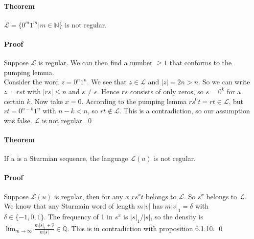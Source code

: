 \documentclass{article}
\begin{document}
\paragraph{Theorem}
$\mathcal{L} = \{0^m1^m | m \in \mathbb{N}\}$ is not regular.

\paragraph{Proof}
Suppose $\mathcal{L}$ is regular. We can then find a number $\ge 1$ that
conforms to the pumping lemma.\\
Consider the word $z = 0^n 1^n$. We see that $z \in \mathcal{L}$ and
$|z| = 2n > n$. So we can write $z = r s t$ with $|r s| \le n$ and
$s \ne \epsilon$. Hence $rs$ consists of only zeros, so $s = 0^k$ for a certain
$k$. Now take $x = 0$. According to the pumping lemma
$r s^0 t = r t \in \mathcal{L}$, but $r t = 0^{n - k} 1^n$ with $n - k < n$, so
$rt \notin \mathcal{L}$. This is a contradiction, so our assumption was false.
$\mathcal{L}$ is not regular. \qed

\paragraph{Theorem}
If $u$ is a Sturmian sequence, the language $\mathcal{L}(u)$ is not regular.

\paragraph{Proof}
Suppose $\mathcal{L}(u)$ is regular, then for any $x$ $r s^x t$ belongs to
$\mathcal{L}$. So $s^x$ belongs to $\mathcal{L}$. We know that any Sturmain
word of length $m|v|$ has $m|v|_1 = \delta$ with $\delta \in \{-1, 0 , 1\}$.
The frequency of 1 in $s^x$ is $|s|_1 / |s|$, so the density is
$\lim_{m \to \infty} \frac{m|s|_1 + \delta}{m|s|} \in \mathbb{Q}$. This is in
contradiction with proposition 6.1.10. \qed
\end{document}
